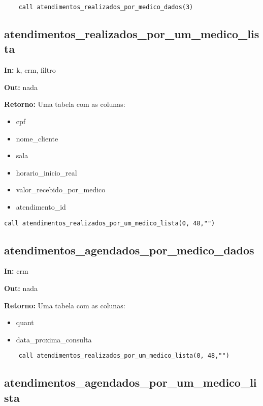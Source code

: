 \begin{verbatim}
	call atendimentos_realizados_por_medico_dados(3)
\end{verbatim}


\subsection{atendimentos\_realizados\_por\_um\_medico\_lista}

\textbf{In:} k, crm, filtro

\textbf{Out:} nada

\textbf{Retorno:} Uma tabela com as colunas:

\begin{itemize}
	\item cpf
	\item nome\_cliente
	\item sala
	\item horario\_inicio\_real
	\item valor\_recebido\_por\_medico
	\item atendimento\_id
\end{itemize}

\begin{verbatim}
call atendimentos_realizados_por_um_medico_lista(0, 48,"")
\end{verbatim}

\subsection{atendimentos\_agendados\_por\_medico\_dados}

\textbf{In:} crm

\textbf{Out:} nada

\textbf{Retorno:} Uma tabela com as colunas:

\begin{itemize}
	\item quant
	\item data\_proxima\_consulta
\end{itemize}

\begin{verbatim}
	call atendimentos_realizados_por_um_medico_lista(0, 48,"")
\end{verbatim}


\subsection{atendimentos\_agendados\_por\_um\_medico\_lista}

